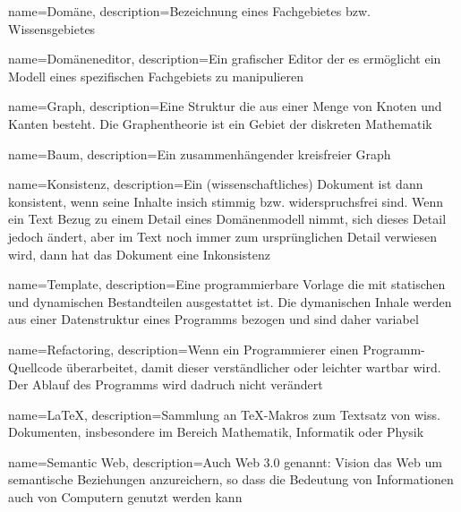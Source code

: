 {
  name=Domäne,
  description={Bezeichnung eines Fachgebietes bzw. Wissensgebietes}
}

{
  name=Domäneneditor,
  description={Ein grafischer Editor der es ermöglicht ein Modell eines spezifischen Fachgebiets zu manipulieren}
}

{
  name=Graph,
  description={Eine Struktur die aus einer Menge von Knoten und Kanten besteht. Die Graphentheorie ist ein Gebiet der diskreten Mathematik}
}

{
  name=Baum,
  description={Ein zusammenhängender kreisfreier Graph}
}

{
  name=Konsistenz,
  description={Ein (wissenschaftliches) Dokument ist dann konsistent, wenn seine Inhalte insich stimmig bzw. widerspruchsfrei sind. Wenn ein Text Bezug zu einem Detail eines Domänenmodell nimmt, sich dieses Detail jedoch ändert, aber im Text noch immer zum ursprünglichen Detail verwiesen wird, dann hat das Dokument eine Inkonsistenz}
}

{
  name=Template,
  description={Eine programmierbare Vorlage die mit statischen und dynamischen Bestandteilen ausgestattet ist. Die dymanischen Inhale werden aus einer Datenstruktur eines Programms bezogen und sind daher variabel}
}

{
  name=Refactoring,
  description={Wenn ein Programmierer einen Programm-Quellcode überarbeitet, damit dieser verständlicher oder leichter wartbar wird. Der Ablauf des Programms wird dadruch nicht verändert}
}

{
  name=LaTeX,
  description={Sammlung an TeX-Makros zum Textsatz von wiss. Dokumenten, insbesondere im Bereich Mathematik, Informatik oder Physik}
}

{
  name=Semantic Web,
  description={Auch Web 3.0 genannt: Vision das Web um semantische Beziehungen anzureichern,
  so dass die Bedeutung von Informationen auch von Computern genutzt werden kann}
}





